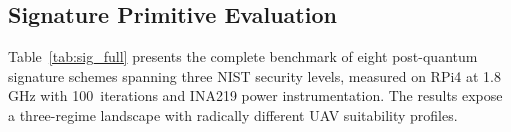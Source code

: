 \subsection{Signature Primitive Evaluation}
\label{sec:sig}

Table~\ref{tab:sig_full} presents the complete benchmark of eight
post-quantum signature schemes spanning three NIST security levels,
measured on RPi4 at 1.8\,GHz with 100~iterations and INA219 power
instrumentation.  The results expose a three-regime landscape with
radically different UAV suitability profiles.

